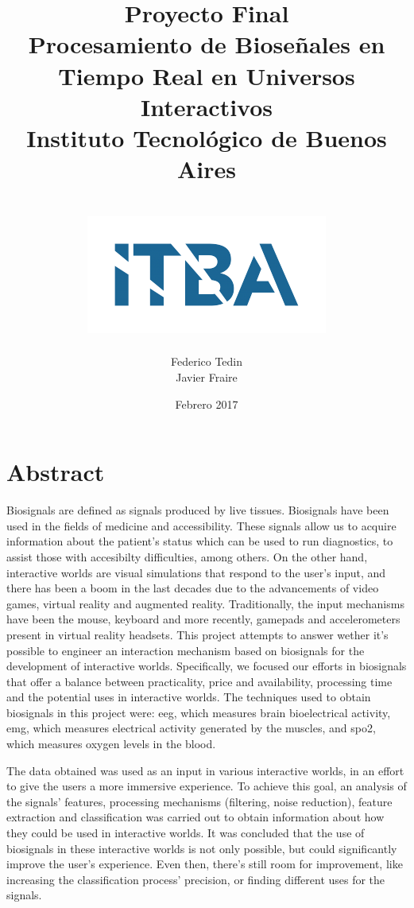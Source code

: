 \documentclass[a4paper]{report}
\title{
	{\LARGE Proyecto Final}\\
	{\Huge Procesamiento de Bioseñales en Tiempo Real en Universos Interactivos}\\
	{\large Instituto Tecnológico de Buenos Aires}\\~\\
	{\includegraphics{itba.png}}
}
\author{{Federico Tedin} \\ {Javier Fraire}}
\date{Febrero 2017}
\begin{document}
\maketitle

\chapter*{Abstract}
\justifying
Biosignals are defined as signals produced by live tissues. Biosignals have been used in the fields of medicine and accessibility. These signals allow us to acquire information about the patient's status which can be used to run diagnostics, to assist those with accesibilty difficulties, among others. On the other hand, interactive worlds are visual simulations that respond to the user's input, and there has been a boom in the last decades due to the advancements of video games, virtual reality and augmented reality.  Traditionally, the input mechanisms have been the mouse, keyboard and more recently, gamepads and accelerometers present in virtual reality headsets. This project attempts to answer wether it's possible to engineer an interaction mechanism based on biosignals for the development of interactive worlds. Specifically, we focused our efforts in biosignals that offer a balance between practicality, price and availability, processing time and the potential uses in interactive worlds. The techniques used to obtain biosignals in this project were: \acrshort{eeg}, which measures brain bioelectrical activity, \acrshort{emg}, which measures electrical activity generated by the muscles, and \acrshort{spo2}, which measures oxygen levels in the blood.

The data obtained was used as an input in various interactive worlds, in an effort to give the users a more immersive experience. To achieve this goal, an analysis of the signals' features, processing mechanisms (filtering, noise reduction), feature extraction and classification was carried out to obtain information about how they could be used in interactive worlds.  It was concluded that the use of biosignals in these interactive worlds is not only possible, but could significantly improve the user's experience. Even then, there's still room for improvement, like increasing the classification process' precision, or finding different uses for the signals.
\end{document}
